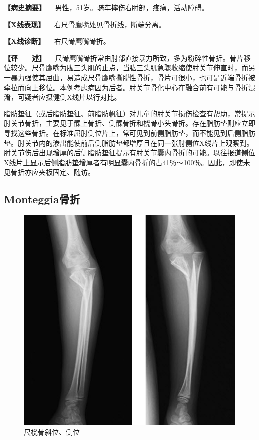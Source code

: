 \textbf{【病史摘要】} 　男性，51岁。骑车摔伤右肘部，疼痛，活动障碍。

\textbf{【X线表现】} 　右尺骨鹰嘴处见骨折线，断端分离。

\textbf{【X线诊断】} 　右尺骨鹰嘴骨折。

\textbf{【评　　述】}
　尺骨鹰嘴骨折常由肘部直接暴力所致，多为粉碎性骨折。骨片移位较少。尺骨鹰嘴为肱三头肌的止点，当肱三头肌急骤收缩使肘关节伸直时，而另一暴力强使其屈曲，易造成尺骨鹰嘴撕脱性骨折，骨片可很小，也可是近端骨折被牵拉而向上移位。本例考虑病因为后者。肘关节骨化中心在融合前有可能与骨折混淆，可疑者应摄健侧X线片以行对比。

脂肪垫征（或后脂肪垫征、前脂肪帆征）对儿童的肘关节损伤检查有帮助，常提示肘关节骨折，主要见于髁上骨折、侧髁骨折和桡骨小头骨折。存在脂肪垫则应立即寻找这些骨折。在标准屈肘侧位片上，常可见到前侧脂肪垫，而不能见到后侧脂肪垫。肘关节内的渗出能使前后侧脂肪垫都增厚且在同一张肘侧位X线片上观察到。肘关节伤后出现增厚的后侧脂肪垫征提示有肘关节囊内骨折的可能。以往报道侧位X线片上显示后侧脂肪垫增厚者有明显囊内骨折的占41％～100％。因此，即使未见骨折亦应夹板固定、随访。

\subsection{Monteggia骨折}

\begin{figure}[!htbp]
 \centering
 \includegraphics{./images/Image00034.jpg}
 \captionsetup{justification=centering}
 \caption{尺桡骨斜位、侧位}
 \label{fig2-3-7}
  \end{figure} 

